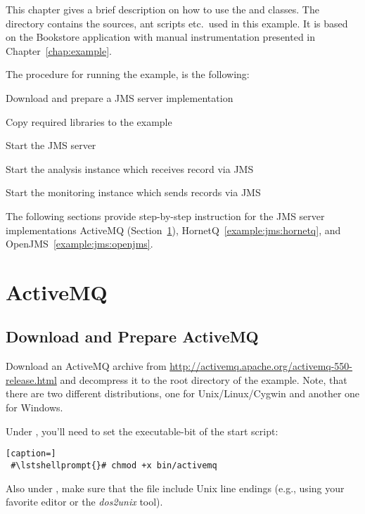 This chapter gives a brief description on how to use the  and  %
classes. The directory \dir{\JMSBookstoreApplicationDirDistro/} contains the %
sources, ant scripts etc.\ used in this example. It is based on the Bookstore %
application with manual instrumentation presented in Chapter~\ref{chap:example}. %

The procedure for running the example, is the following:
\begin{compactenum}
 \item Download and prepare a JMS server implementation
 \item Copy required libraries to the example
 \item Start the JMS server
 \item Start the analysis instance which receives record via JMS
 \item Start the monitoring instance which sends records via JMS
\end{compactenum}

The following sections provide step-by-step instruction for the %
JMS server implementations ActiveMQ (Section~\ref{example:jms:activemq}), %
HornetQ~\ref{example:jms:hornetq}, and OpenJMS~\ref{example:jms:openjms}.

\section{ActiveMQ}\label{example:jms:activemq}

\subsection{Download and Prepare ActiveMQ}

Download an ActiveMQ archive from \url{http://activemq.apache.org/activemq-550-release.html} %
and decompress it to the root directory of the example. Note, that there are two different %
distributions, one for Unix/Linux/Cygwin and another one for Windows. 

Under \UnixLikeSystems{}, you'll need to set the executable-bit of the start script:

\setBashListing
\begin{lstlisting}[caption=]
 #\lstshellprompt{}# chmod +x bin/activemq
\end{lstlisting}

Also under \UnixLikeSystems{}, make sure that the file  %
include Unix line endings (e.g., using your favorite editor or the \textit{dos2unix} tool).

